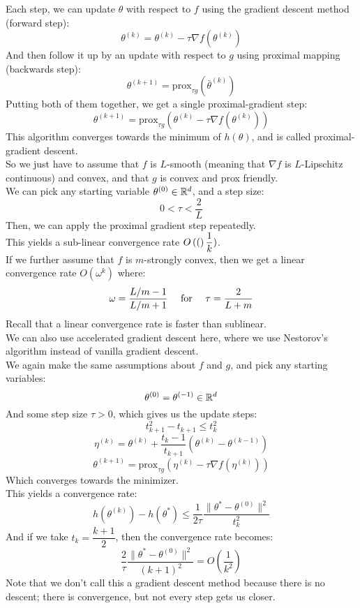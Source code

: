 \documentclass[12pt]{article}
\begin{document}
Each step, we can update $\theta$
with respect to $f$ using the gradient
descent method (forward step):
\[ \theta^{(k)} = \theta^{(k)} - 
\tau \nabla f(\theta^{(k)}) \]
And then follow it up by an update
with respect to $g$ using proximal mapping
(backwards step):
\[ \theta^{(k+1)} = \text{prox}_{\tau g}
(\bar{\theta}^{(k)}) \]
Putting both of them together,
we get a single proximal-gradient step:
\[ \theta^{(k+1)} = \text{prox}_{\tau g} 
\left( \theta^{(k)} - \tau \nabla 
f(\theta^{(k)}) \right) \]
This algorithm converges towards
the minimum of $h(\theta)$,
and is called proximal-gradient descent. \\

So we just have to assume that $f$
is $L$-smooth (meaning that $\nabla f$
is $L$-Lipschitz continuous)
and convex, and that $g$
is convex and prox friendly. \\
We can pick any starting variable 
$\theta^{(0)} \in \mathbb{R}^d$,
and a step size:
\[ 0 < \tau < \dfrac{2}{L} \]
Then, we can apply the proximal gradient step
repeatedly. \\

This yields a sub-linear convergence rate
$O\left( ( \right)\dfrac{1}{k})$. \\

If we further assume that $f$
is $m$-strongly convex, then we
get a linear convergence rate
$O(\omega^k)$ where:
\[ \omega = \frac{L/m - 1}{L/m + 1} \quad 
\text{ for } \quad \tau = \frac{2}{L + m}\]
Recall that a linear convergence rate
is faster than sublinear. \\

We can also use accelerated gradient descent 
here, where we use Nestorov's algorithm
instead of vanilla gradient descent. \\

We again make the same assumptions
about $f$ and $g$,
and pick any starting variables:
\[ \theta^{(0)} = \theta^{(-1)} \in \mathbb{R}^d \]
And some step size $\tau > 0$,
which gives us the update steps:
\[ t_{k+1}^2 - t_{k+1} \leq t_k^2 \]
\[ \eta^{(k)} = \theta^{(k)} + 
\frac{t_k - 1}{t_{k+1}} \left( \theta^{(k)} 
- \theta^{(k-1)} \right) \]
\[ \theta^{(k+1)} = \text{prox}_{\tau g} 
\left( \eta^{(k)} - \tau \nabla f(\eta^{(k)}) 
\right)\]
Which converges towards the minimizer. \\

This yields a convergence rate:
\[ h(\theta^{(k)}) - h(\theta^*) 
\leq \frac{1}{2\tau} \frac{\|\theta^* - 
\theta^{(0)}\|^2}{t_k^2} \]
And if we take $t_k = \dfrac{k+1}{2}$,
then the convergence rate becomes:
\[ \frac{2}{\tau} \frac{\|\theta^* - 
\theta^{(0)}\|^2}{(k+1)^2} = 
O\left(\frac{1}{k^2}\right) \]
Note that we don't call this a gradient
descent method because there is no descent;
there is convergence, but not every step
gets us closer. \\
\end{document}
